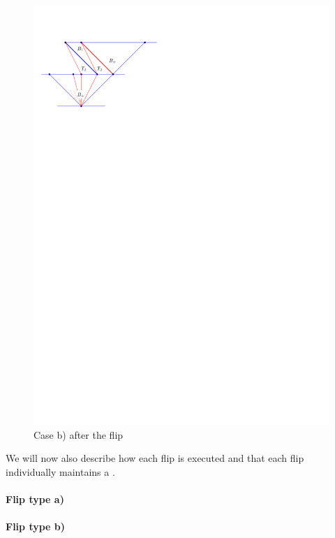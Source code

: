 \begin{figure}[h]
  \centering
  \includegraphics[scale=1]{unifiedAlgo/img/flipactionb}
  \caption{Case b) after the flip}
  \label{fig:uni:flipactionb}
\end{figure}

We will now also describe how each flip is executed and that each flip individually maintains a \rel.

\paragraph{Flip type a)}

\paragraph{Flip type b)}




